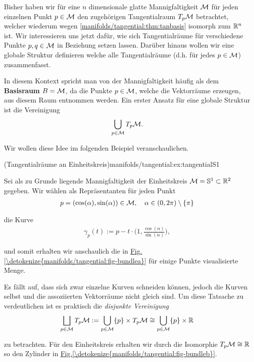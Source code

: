 \par
Bisher haben wir für eine \(n\) dimensionale glatte Mannigfaltigkeit \(\mathcal{M}\) für jeden einzelnen Punkt \(p\in\mathcal{M}\) den zugehörigen Tangentialraum \(T_p\mathcal{M}\) betrachtet, welcher wiederum wegen \cref{manifolds/tangential:thm:tanbasis} isomorph zum \(\mathbb{R}^n\) ist.
Wir interessieren uns jetzt dafür, wie sich Tangentialräume für verschiedene Punkte \(p,q\in \mathcal{M}\) in Beziehung setzen lassen.
Darüber hinaus wollen wir eine globale Struktur definieren welche alle Tangentialräume (d.h. für jedes \(p\in\mathcal{M}\)) zusammenfasst.

\par
In diesem Kontext spricht man von der Mannigfaltigkeit häufig als dem \textbf{Basisraum} \(B=\mathcal{M}\), da die Punkte \(p \in \mathcal{M}\), welche die Vektorräume erzeugen, aus diesem Raum entnommen werden.
Ein erster Ansatz für eine globale Struktur ist die Vereinigung
\begin{align*}
\bigcup_{p\in\mathcal{M}} T_p\mathcal{M}.
\end{align*}
\par
Wir wollen diese Idee im folgenden Beispiel veranschaulichen.
\begin{example}{(Tangentialräume an Einheitskreis)}{manifolds/tangential:ex:tangentialS1}



\par
Sei als zu Grunde liegende Mannigfaltigkeit der Einheitskreis \(\mathcal{M} = \mathbb{S}^1\subset\mathbb{R}^2\) gegeben.
Wir wählen als Repräsentanten für jeden Punkt
\begin{align*}
p=(\cos(\alpha), \sin(\alpha))\in\mathcal{M}, \quad \alpha\in (0,2\pi) \setminus \{\pi\}
\end{align*}
\par
die Kurve
\begin{align*}
\gamma_p(t) := p - t \cdot\big(1, \frac{\cos(\alpha)}{\sin(\alpha)}\big),
\end{align*}
\par
und somit erhalten wir anschaulich die in \hyperref[\detokenize{manifolds/tangential:fig-bundlea}]{Fig.\@ \ref{\detokenize{manifolds/tangential:fig-bundlea}}} für einige Punkte visualisierte Menge.

\par
Es fällt auf, dass sich zwar einzelne Kurven schneiden können, jedoch die Kurven selbst und die assoziierten Vektorräume nicht gleich sind.
Um diese Tatsache zu verdeutlichen ist es praktisch die \emph{disjunkte Vereinigung}
\begin{align*}
\bigsqcup_{p\in\mathcal{M}} T_p\mathcal{M} := \bigcup_{p\in\mathcal{M}} \{p\} \times T_p\mathcal{M} \cong \bigcup_{p\in\mathcal{M}} \{p\} \times \mathbb{R}
\end{align*}
\par
zu betrachten.
Für den Einheitskreis erhalten wir durch die Isomorphie \(T_p\mathcal{M} \cong \mathbb{R}\) so den Zylinder in \hyperref[\detokenize{manifolds/tangential:fig-bundleb}]{Fig.\@ \ref{\detokenize{manifolds/tangential:fig-bundleb}}}.
\end{example}

